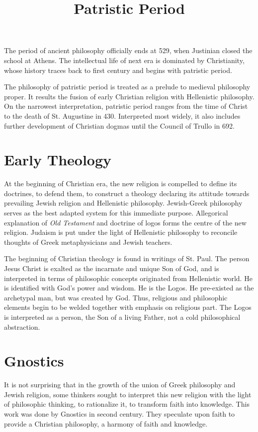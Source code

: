 \documentclass[11pt]{article}
\title{Patristic Period}
\date{}
\begin{document}
  \maketitle

  \linenumbers
The period of ancient philosophy officially ends at 529, when Justinian closed the school at Athens. 
The intellectual life of next era is dominated by Christianity, whose history traces back to first century and begins with patristic period.

\newline

The philosophy of patristic period is treated as a prelude to medieval philosophy proper. 
It results the fusion of early Christian religion with Hellenistic philosophy. 
On the narrowest interpretation, patristic period ranges from the time of Christ to the death of St. Augustine in 430. 
Interpreted most widely, it also includes further development of Christian dogmas until the Council of Trullo in 692.

\section{Early Theology}
At the beginning of Christian era, the new religion is compelled to define its doctrines, to defend them, to construct a theology declaring its attitude towards prevailing Jewish religion and Hellenistic philosophy. 
Jewish-Greek philosophy serves as the best adapted system for this immediate purpose. 
Allegorical explanation of \textit{Old Testament} and doctrine of logos forms the centre of the new religion. 
Judaism is put under the light of Hellenistic philosophy to reconcile thoughts of Greek metaphysicians and Jewish teachers. 

\newline

The beginning of Christian theology is found in writings of St. Paul. 
The person Jesus Christ is exalted as the incarnate and unique Son of God, and is interpreted in terms of philosophic concepts originated from Hellenistic world. 
He is identified with God's power and wisdom. 
He is the Logos. 
He pre-existed as the archetypal man, but was created by God.
Thus, religious and philosophic elements begin to be welded together with emphasis on religious part. 
The Logos is interpreted as a person, the Son of a living Father, not a cold philosophical abstraction.

\section{Gnostics}
It is not surprising that in the growth of the union of Greek philosophy and Jewish religion, some thinkers sought to interpret this new religion with the light of philosophic thinking, to rationalize it, to transform faith into knowledge. 
This work was done by Gnostics in second century. 
They speculate upon faith to provide a Christian philosophy, a harmony of faith and knowledge. 
\end{document}
